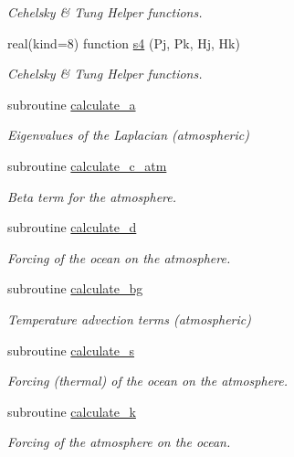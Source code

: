 \begin{DoxyCompactItemize}
\begin{DoxyCompactList}\small\item\em Cehelsky \& Tung Helper functions. \end{DoxyCompactList}\item 
real(kind=8) function \hyperlink{namespaceinprod__analytic_a8dacf930ffdf8fd09da0a77bfd4d3a4b}{s4} (Pj, Pk, Hj, Hk)
\begin{DoxyCompactList}\small\item\em Cehelsky \& Tung Helper functions. \end{DoxyCompactList}\item 
subroutine \hyperlink{namespaceinprod__analytic_a9a003ced8e18bf5299c05dc76a8b1e47}{calculate\+\_\+a}
\begin{DoxyCompactList}\small\item\em Eigenvalues of the Laplacian (atmospheric) \end{DoxyCompactList}\item 
subroutine \hyperlink{namespaceinprod__analytic_afa4abc3665e4628bda2deb421c123e05}{calculate\+\_\+c\+\_\+atm}
\begin{DoxyCompactList}\small\item\em Beta term for the atmosphere. \end{DoxyCompactList}\item 
subroutine \hyperlink{namespaceinprod__analytic_a1b0c41711a02f385766aeef2faf22830}{calculate\+\_\+d}
\begin{DoxyCompactList}\small\item\em Forcing of the ocean on the atmosphere. \end{DoxyCompactList}\item 
subroutine \hyperlink{namespaceinprod__analytic_a9d5aac589aca6ec73373fa05a8195c20}{calculate\+\_\+bg}
\begin{DoxyCompactList}\small\item\em Temperature advection terms (atmospheric) \end{DoxyCompactList}\item 
subroutine \hyperlink{namespaceinprod__analytic_af2f7504623cdd4e4e6b4b977126475ea}{calculate\+\_\+s}
\begin{DoxyCompactList}\small\item\em Forcing (thermal) of the ocean on the atmosphere. \end{DoxyCompactList}\item 
subroutine \hyperlink{namespaceinprod__analytic_acb883b9fbefbca46b83b384ee74ed703}{calculate\+\_\+k}
\begin{DoxyCompactList}\small\item\em Forcing of the atmosphere on the ocean. \end{DoxyCompactList}\item 

\end{DoxyCompactItemize}
